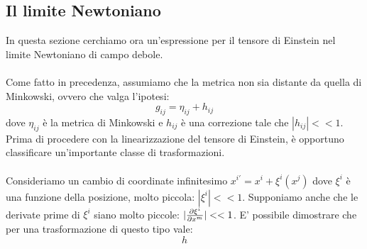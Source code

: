 \documentclass[]{report}
\theoremstyle{definition}
\theoremstyle{Theorem}
\theoremstyle{definition}
\theoremstyle{definition}
\theoremstyle{definition}
\begin{document}
\subsection{Il limite Newtoniano}
In questa sezione cerchiamo ora un'espressione per il tensore di Einstein nel limite Newtoniano di campo debole.\\
\\
Come fatto in precedenza, assumiamo che la metrica non sia distante da quella di Minkowski, ovvero che valga l'ipotesi:
$$g_{ij}=\eta_{ij}+h_{ij}$$
dove $\eta_{ij}$ è la metrica di Minkowski e $h_{ij}$ è una correzione tale che $|h_{ij}|<<1$. Prima di procedere con la linearizzazione del tensore di Einstein, è opportuno classificare un'importante classe di trasformazioni.\\
\\
Consideriamo un cambio di coordinate infinitesimo $x^{i'}=x^i+\xi^i(x^j)$ dove $\xi^i$ è una funzione della posizione, molto piccola: $|\xi^i|<<1$. Supponiamo anche che le derivate prime di $\xi^i$ siano molto piccole: $|{\partial\xi^i\over \partial x^m}|<<1$. E' possibile dimostrare che per una trasformazione di questo tipo vale:
$$h$$ 
\end{document}
